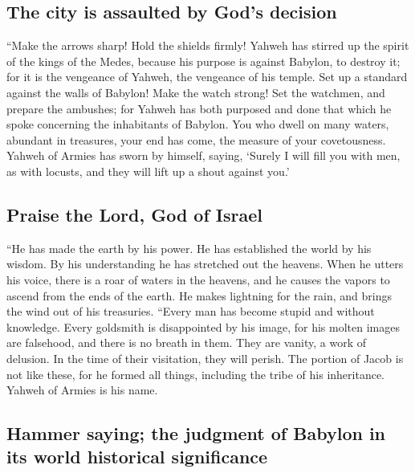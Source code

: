 \hypertarget{the-city-is-assaulted-by-gods-decision}{%
\subsection{The city is assaulted by God's
decision}\label{the-city-is-assaulted-by-gods-decision}}

 ``Make the arrows sharp! Hold the shields firmly! Yahweh
has stirred up the spirit of the kings of the Medes, because his purpose
is against Babylon, to destroy it; for it is the vengeance of Yahweh,
the vengeance of his temple.  Set up a standard against
the walls of Babylon! Make the watch strong! Set the watchmen, and
prepare the ambushes; for Yahweh has both purposed and done that which
he spoke concerning the inhabitants of Babylon.  You who
dwell on many waters, abundant in treasures, your end has come, the
measure of your covetousness.  Yahweh of Armies has sworn
by himself, saying, `Surely I will fill you with men, as with locusts,
and they will lift up a shout against you.'

\hypertarget{praise-the-lord-god-of-israel}{%
\subsection{Praise the Lord, God of
Israel}\label{praise-the-lord-god-of-israel}}

 ``He has made the earth by his power. He has established
the world by his wisdom. By his understanding he has stretched out the
heavens.  When he utters his voice, there is a roar of
waters in the heavens, and he causes the vapors to ascend from the ends
of the earth. He makes lightning for the rain, and brings the wind out
of his treasuries.  ``Every man has become stupid and
without knowledge. Every goldsmith is disappointed by his image, for his
molten images are falsehood, and there is no breath in them.
 They are vanity, a work of delusion. In the time of
their visitation, they will perish.  The portion of Jacob
is not like these, for he formed all things, including the tribe of his
inheritance. Yahweh of Armies is his name.

\hypertarget{hammer-saying-the-judgment-of-babylon-in-its-world-historical-significance}{%
\subsection{Hammer saying; the judgment of Babylon in its world
historical
significance}\label{hammer-saying-the-judgment-of-babylon-in-its-world-historical-significance}}

